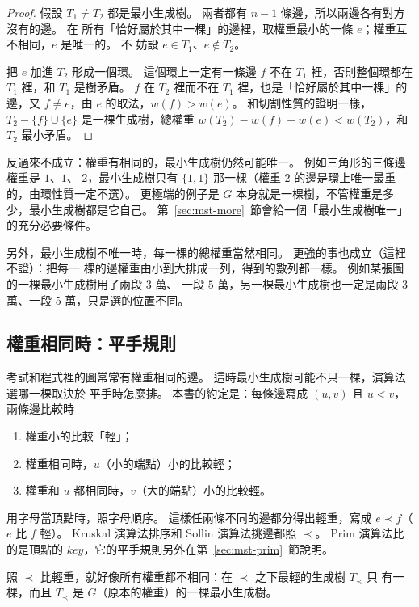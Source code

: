 \begin{proof}
假設 $T_1 \ne T_2$ 都是最小生成樹。 兩者都有 $n - 1$ 條邊，所以兩邊各有對方沒有的邊。 在
所有「恰好屬於其中一棵」的邊裡，取權重最小的一條 $e$；權重互不相同，$e$ 是唯一的。 不
妨設 $e \in T_1$、$e \notin T_2$。

把 $e$ 加進 $T_2$ 形成一個環。 這個環上一定有一條邊 $f$ 不在 $T_1$ 裡，否則整個環都在
$T_1$ 裡，和 $T_1$ 是樹矛盾。 $f$ 在 $T_2$ 裡而不在 $T_1$ 裡，也是「恰好屬於其中一棵」的
邊，又 $f \ne e$，由 $e$ 的取法，$w(f) > w(e)$。 和切割性質的證明一樣，$T_2 - \{f\} \cup
\{e\}$ 是一棵生成樹，總權重 $w(T_2) - w(f) + w(e) < w(T_2)$，和 $T_2$ 最小矛盾。
\end{proof}

反過來不成立：權重有相同的，最小生成樹仍然可能唯一。 例如三角形的三條邊權重是 $1$、$1$、
$2$，最小生成樹只有 $\{1, 1\}$ 那一棵（權重 $2$ 的邊是環上唯一最重的，由環性質一定不選）。
更極端的例子是 $G$ 本身就是一棵樹，不管權重是多少，最小生成樹都是它自己。
第~\ref{sec:mst-more}~節會給一個「最小生成樹唯一」的充分必要條件。

另外，最小生成樹不唯一時，每一棵的總權重當然相同。 更強的事也成立（這裡不證）：把每一
棵的邊權重由小到大排成一列，得到的數列都一樣。 例如某張圖的一棵最小生成樹用了兩段 $3$ 萬、
一段 $5$ 萬，另一棵最小生成樹也一定是兩段 $3$ 萬、一段 $5$ 萬，只是選的位置不同。

\subsection{權重相同時：平手規則}
\label{sec:mst-ties}

考試和程式裡的圖常常有權重相同的邊。 這時最小生成樹可能不只一棵，演算法選哪一棵取決於
平手時怎麼排。 本書的約定是：每條邊寫成 $(u, v)$ 且 $u < v$，兩條邊比較時

\begin{enumerate}
\item 權重小的比較「輕」；
\item 權重相同時，$u$（小的端點）小的比較輕；
\item 權重和 $u$ 都相同時，$v$（大的端點）小的比較輕。
\end{enumerate}

用字母當頂點時，照字母順序。 這樣任兩條不同的邊都分得出輕重，寫成 $e \prec f$（$e$ 比 $f$
輕）。 Kruskal 演算法排序和 Sollin 演算法挑邊都照 $\prec$。 Prim 演算法比的是頂點的
$\mathit{key}$，它的平手規則另外在第~\ref{sec:mst-prim}~節說明。

\begin{lemma}
\label{lem:mst-ties}
照 $\prec$ 比輕重，就好像所有權重都不相同：在 $\prec$ 之下最輕的生成樹 $T_{\prec}$ 只
有一棵，而且 $T_{\prec}$ 是 $G$（原本的權重）的一棵最小生成樹。
\end{lemma}

